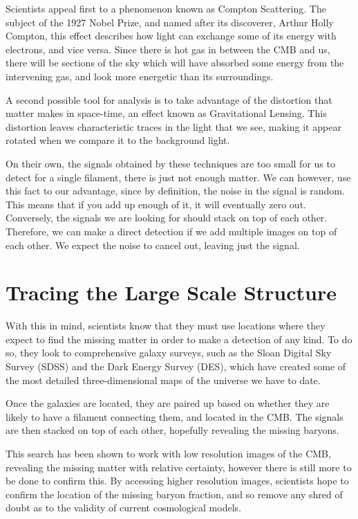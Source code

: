 \documentclass{nature}
\begin{document}
Scientists appeal first to a phenomenon known as Compton Scattering. The subject of the 1927 Nobel Prize, and named after its discoverer, Arthur Holly Compton, this effect describes how light can exchange some of its energy with electrons, and vice versa. Since there is hot gas in between the CMB and us, there will be sections of the sky which will have absorbed some energy from the intervening gas, and look more energetic than its surroundings. 

A second possible tool for analysis is to take advantage of the distortion that matter makes in space-time, an effect known as Gravitational Lensing. This distortion leaves characteristic traces in the light that we see, making it appear rotated when we compare it to the background light. 

On their own, the signals obtained by these techniques are too small for us to detect for a single filament, there is just not enough matter. We can however, use this fact to our advantage, since by definition, the noise in the signal is random. This means that if you add up enough of it, it will eventually zero out. Conversely, the signals we are looking for should stack on top of each other. Therefore, we can make a direct detection if we add multiple images on top of each other. We expect the noise to cancel out, leaving just the signal.

\section{Tracing the Large Scale Structure}

With this in mind, scientists know that they must use locations where they expect to find the missing matter in order to make a detection of any kind. To do so, they look to comprehensive galaxy surveys, such as the Sloan Digital Sky Survey (SDSS) and the Dark Energy Survey (DES), which have created some of the most detailed three-dimensional maps of the universe we have to date.

Once the galaxies are located, they are paired up based on whether they are likely to have a filament connecting them, and located in the CMB. The signals are then stacked on top of each other, hopefully revealing the missing baryons.

This search has been shown to work with low resolution images of the CMB, revealing the missing matter with relative certainty, however there is still more to be done to confirm this. By accessing higher resolution images, scientists hope to confirm the location of the missing baryon fraction, and so remove any shred of doubt as to the validity of current cosmological models.



\end{document}
